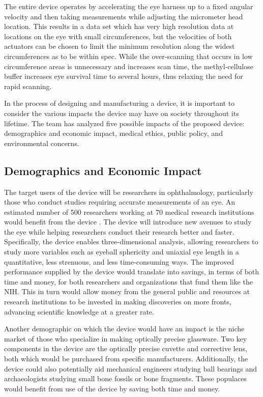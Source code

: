 \documentclass{article}
\begin{document}
The entire device operates by accelerating the eye harness up to a fixed angular velocity and then taking measurements while adjusting the micrometer head location. This results in a data set which has very high resolution data at locations on the eye with small circumferences, but the velocities of both actuators can be chosen to limit the minimum resolution along the widest circumferences as to be within spec. While the over-scanning that occurs in low circumference areas is unnecessary and increases scan time, the methyl-cellulose buffer increases eye survival time to several hours, thus relaxing the need for rapid scanning.
 
In the process of designing and manufacturing a device, it is important to consider the various impacts the device may have on society throughout its lifetime. The team has analyzed five possible impacts of the proposed device: demographics and economic impact, medical ethics, public policy, and environmental concerns. 
 
 
\subsection{Demographics and Economic Impact}
\label{sec:Demographics}
 
The target users of the device will be researchers in ophthalmology, particularly those who conduct studies requiring accurate measurements of an eye. An estimated number of 500 researchers working at 70 medical research institutions would benefit from the device \cite{Nickerson}. The device will introduce new avenues to study the eye while helping researchers conduct their research better and faster. Specifically, the device enables three-dimensional analysis, allowing researchers to study more variables such as eyeball sphericity and uniaxial eye length in a quantitative, less strenuous, and less time-consuming ways. The improved performance supplied by the device would translate into savings, in terms of both time and money, for both researchers and organizations that fund them like the NIH. This in turn would allow money from the general public and resources at research institutions to be invested in making discoveries on more fronts, advancing scientific knowledge at a greater rate. 
 
Another demographic on which the device would have an impact is the niche market of those who specialize in making optically precise glassware. Two key components in the device are the optically precise cuvette and corrective lens, both which would be purchased from specific manufacturers. Additionally, the device could also potentially aid mechanical engineers studying ball bearings and archaeologists studying small bone fossils or bone fragments. These populaces would benefit from use of the device by saving both time and money. 
\end{document}
